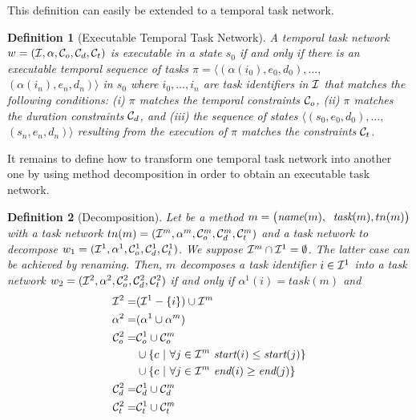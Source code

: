 \documentclass[letterpaper]{article} %
\newtheorem{definition}{Definition}
\newcommand{\name}{\text{\it name}}
\newcommand{\tstart}{\text{\it start}}
\newcommand{\tend}{\text{\it end}}
\newcommand{\task}{\text{\it task}}
\begin{document}
 This definition can easily be extended to a temporal task network.

  \begin{definition}[Executable Temporal Task Network] A temporal task network $w = ({\cal{I}}, \alpha, {\cal{C}}_o, {\cal{C}}_d, {\cal{C}}_t)$ is executable in a state $s_0$ if and only if there is an executable temporal sequence of tasks $\pi = \langle (\alpha(i_0), e_0, d_0), \ldots,$ $(\alpha(i_n), e_n, d_n)\rangle$ in $s_0$ where $i_0, \ldots, i_n$ are task identifiers in $\cal{I}$ that matches the following conditions: (i) $\pi$ matches the temporal constraints ${\cal{C}}_o$, (ii) $\pi$ matches the duration constraints ${\cal{C}}_d$, and (iii) the sequence of states $\langle (s_0, e_0, d_0), \ldots,$ $(s_n, e_n, d_n) \rangle$ resulting from the execution of $\pi$ matches the constraints ${\cal{C}}_t$.
  \end{definition}

It remains to define how to transform one temporal task network into another one by using method decomposition in order to obtain an executable task network.

\begin{definition}[Decomposition]
Let be a method \mbox{$m = \bigl(\name(m),$ $\task(m), tn(m)\bigr)$} with a task network $tn(m) = ({\cal{I}}^m, \alpha^m, {\cal{C}}_{o}^{m},{\cal{C}}_{d}^{m}, {\cal{C}}_{t}^{m})$ and a task network to decompose $w_1= ({\cal{I}}^1, \alpha^1, {\cal{C}}_{o}^{1},{\cal{C}}_{d}^{1}, {\cal{C}}_{t}^{1})$. We suppose ${\cal{I}}^m \cap {\cal{I}}^1 = \emptyset$. The latter case can be achieved by renaming. Then, $m$ decomposes a task identifier $i \in {\cal{I}}^1$ into a task network $w_2= ({\cal{I}}^2, \alpha^2, {\cal{C}}_{o}^{2},{\cal{C}}_{d}^{2}, {\cal{C}}_{t}^{2})$ if and only if $\alpha^1(i) = task(m)$ and
\begin{equation*} \label{eq1}
\begin{aligned}
{\cal{I}}^2 = & ({\cal{I}}^1 - \{i\}) \cup {\cal{I}}^m\\
\alpha^2 = & (\alpha^1 \cup \alpha^m)\\
{\cal{C}}^{2}_{o} = & {\cal{C}}^{1}_{o} \cup {\cal{C}}^{m}_{o} \\
        & \cup \{ c \ | \ \forall j \in {\cal{I}}^m \ \tstart(i) \leq \tstart(j) \}  \\
        & \cup \{ c \ | \ \forall j \in {\cal{I}}^m \ \tend(i) \geq \tend(j) \}  \\
{\cal{C}}^{2}_{d}  = & {\cal{C}}^{1}_{d} \cup {\cal{C}}^{m}_{d} \\
{\cal{C}}^{2}_{t}  = & {\cal{C}}^{1}_{t} \cup {\cal{C}}^{m}_{t} \\
\end{aligned}
\end{equation*}
\end{definition}
\end{document}
